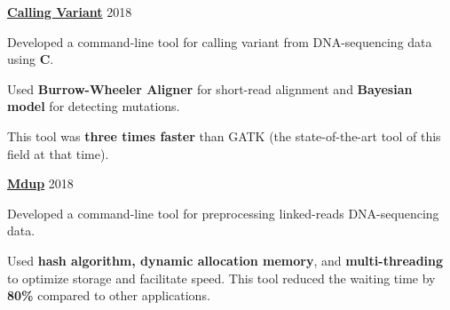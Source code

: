 \begin{cventries} %
  \cvsimpleentry
    {\href{https://github.com/tuan-tt/calling_variant}{\textbf{Calling Variant}}} %
    {2018} %
    {
      \begin{cvitems} %
        \item {Developed a command-line tool for calling variant from DNA-sequencing data using \textbf{C}.}
        \item {Used \textbf{Burrow-Wheeler Aligner} for short-read alignment and \textbf{Bayesian model} for detecting mutations.}
        \item {This tool was \textbf{three times faster} than GATK (the state-of-the-art tool of this field at that time).}
      \end{cvitems}
    }

  \cvsimpleentry
    {\href{https://github.com/kspham/mdup}{\textbf{Mdup}}} %
    {2018} %
    {
      \begin{cvitems} %
        \item {Developed a command-line tool for preprocessing linked-reads DNA-sequencing data.}
        \item {Used \textbf{hash algorithm, dynamic allocation memory}, and \textbf{multi-threading} to optimize storage and facilitate speed. This tool reduced the waiting time by \textbf{80\%} compared to other applications.}
      \end{cvitems}
    }

\end{cventries}
